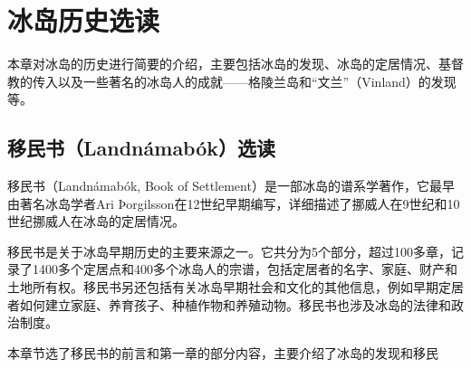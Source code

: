 \chapter{冰岛历史选读}
本章对冰岛的历史进行简要的介绍，主要包括冰岛的发现、冰岛的定居情况、基督教的传入以及一些著名的冰岛人的成就——格陵兰岛和“文兰”（Vinland）的发现等。

\section{移民书（Landnámabók）选读}
移民书（Landnámabók, Book of Settlement）是一部冰岛的谱系学著作，它最早由著名冰岛学者Ari Þorgilsson在12世纪早期编写，详细描述了挪威人在9世纪和10世纪挪威人在冰岛的定居情况。

移民书是关于冰岛早期历史的主要来源之一。它共分为5个部分，超过100多章，记录了1400多个定居点和400多个冰岛人的宗谱，包括定居者的名字、家庭、财产和土地所有权。移民书另还包括有关冰岛早期社会和文化的其他信息，例如早期定居者如何建立家庭、养育孩子、种植作物和养殖动物。移民书也涉及冰岛的法律和政治制度。

本章节选了移民书的前言和第一章的部分内容，主要介绍了冰岛的发现和移民


